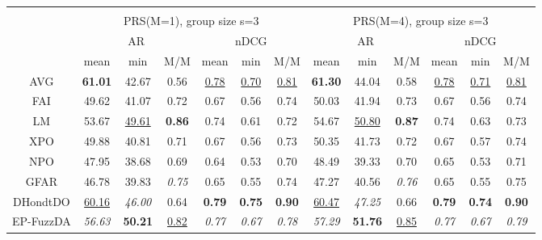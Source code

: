 \begin{tabular}{ c | c c c | c c c || c c c | c c c}
\multicolumn{12}{c}{} \\
\multicolumn{1}{c}{} & \multicolumn{6}{c}{PRS(M=1), group size s=3} & \multicolumn{6}{c}{PRS(M=4), group size s=3} \\
\multicolumn{1}{c}{} & \multicolumn{3}{c}{AR} & \multicolumn{3}{c}{nDCG} & \multicolumn{3}{c}{AR} & \multicolumn{3}{c}{nDCG} \\
& mean & min & M/M & mean & min & M/M & mean & min & M/M & mean & min & M/M \\
\hline
AVG & \textbf{61.01} & 42.67 & 0.56 & \underline{0.78} & \underline{0.70} & \underline{0.81} & \textbf{61.30} & 44.04 & 0.58 & \underline{0.78} & \underline{0.71} & \underline{0.81} \\
FAI & 49.62 & 41.07 & 0.72 & 0.67 & 0.56 & 0.74 & 50.03 & 41.94 & 0.73 & 0.67 & 0.56 & 0.74 \\
LM & 53.67 & \underline{49.61} & \textbf{0.86} & 0.74 & 0.61 & 0.72 & 54.67 & \underline{50.80} & \textbf{0.87} & 0.74 & 0.63 & 0.73 \\
XPO & 49.88 & 40.81 & 0.71 & 0.67 & 0.56 & 0.73 & 50.35 & 41.73 & 0.72 & 0.67 & 0.57 & 0.74 \\
NPO & 47.95 & 38.68 & 0.69 & 0.64 & 0.53 & 0.70 & 48.49 & 39.33 & 0.70 & 0.65 & 0.53 & 0.71 \\
GFAR & 46.78 & 39.83 & \textit{0.75} & 0.65 & 0.55 & 0.74 & 47.27 & 40.56 & \textit{0.76} & 0.65 & 0.55 & 0.75 \\
DHondtDO & \underline{60.16} & \textit{46.00} & 0.64 & \textbf{0.79} & \textbf{0.75} & \textbf{0.90} & \underline{60.47} & \textit{47.25} & 0.66 & \textbf{0.79} & \textbf{0.74} & \textbf{0.90} \\
EP-FuzzDA & \textit{56.63} & \textbf{50.21} & \underline{0.82} & \textit{0.77} & \textit{0.67} & \textit{0.78} & \textit{57.29} & \textbf{51.76} & \underline{0.85} & \textit{0.77} & \textit{0.67} & \textit{0.79} \\


\end{tabular}
